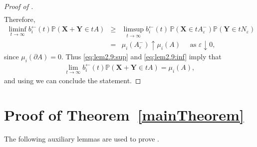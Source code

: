 \documentclass[aos]{imsart}
\numberwithin{equation}{section}
\theoremstyle{plain} %
\theoremstyle{remark}
\renewcommand\P{\mathbb{P}}
\def\bX{\boldsymbol X}
\def\bY{\boldsymbol Y}
\begin{document}
\begin{proof}[Proof of ]
\begin{eqnarray*}
\end{eqnarray*}
Therefore,
\begin{eqnarray}
    \liminf_{t\to\infty}b_i^{\leftarrow}(t)
    \P(\bX+\bY\in tA)
    &\geq& \limsup_{t\to\infty}b_i^{\leftarrow}(t)\,\P(\bX\in tA_{\varepsilon}^-)\P(\bY\in tN_{\varepsilon}) \nonumber\\
    &=& \mu_i( A_{\varepsilon}^-)\uparrow \mu_i(A) \quad \text{ as } \varepsilon\downarrow 0, \label{eq:lem2.9:inf}
\end{eqnarray}
since $\mu_i(\partial A)=0$. Thus \eqref{eq:lem2.9:sup} and \eqref{eq:lem2.9:inf} imply that
\begin{eqnarray*}
    \lim_{t\to\infty}b_i^{\leftarrow}(t)
    \P(\bX+\bY\in tA)=\mu_i(A),
\end{eqnarray*}
and using  we can conclude the statement.
\end{proof}





\section{Proof of Theorem~\ref{mainTheorem}} \label{sec:proofmaintheorem}


The following auxiliary lemmas are used to prove .
\end{document}
